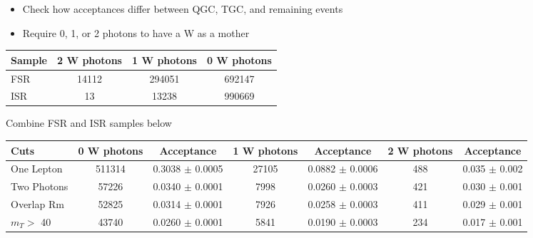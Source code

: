 \documentclass{beamer}
\begin{document}
 {


    \begin{itemize}
        \item Check how acceptances differ between QGC, TGC, and remaining events
        \item Require 0, 1, or 2 photons to have a W as a mother
    \end{itemize}

    \vspace{4mm}

    \begin{center}
    \scriptsize
    \begin{tabular}{l | c | c | c | }
        Sample & 2 W photons & 1 W photons & 0 W photons \\ \hline

          FSR  & 14112 & 294051 & 692147 \\ 
          ISR  & 13    &  13238 & 990669 \\
     \end{tabular}
    \end{center}

    \vspace{2mm}

    \normalsize
    Combine FSR and ISR samples below

    \vspace{2mm}

    \tiny
    \begin{tabular}{| l | c | c | c | c | c | c | }
          Cuts         & 0 W photons       & Acceptance           & 1 W photons      & Acceptance           & 2 W photons   & Acceptance         \\  \hline
          One Lepton   & 511314  & 0.3038 $\pm$ 0.0005  & 27105  & 0.0882 $\pm$ 0.0006  & 488  & 0.035 $\pm$ 0.002  \\ 
          Two Photons  & 57226   & 0.0340 $\pm$ 0.0001  & 7998   & 0.0260 $\pm$ 0.0003  & 421  & 0.030 $\pm$ 0.001  \\ 
          Overlap Rm   & 52825   & 0.0314 $\pm$ 0.0001  & 7926   & 0.0258 $\pm$ 0.0003  & 411  & 0.029 $\pm$ 0.001  \\ 
          $m_{T} >$ 40 & 43740   & 0.0260 $\pm$ 0.0001  & 5841   & 0.0190 $\pm$ 0.0003  & 234  & 0.017 $\pm$ 0.001  \\ 
     \end{tabular}

}
\end{document}
